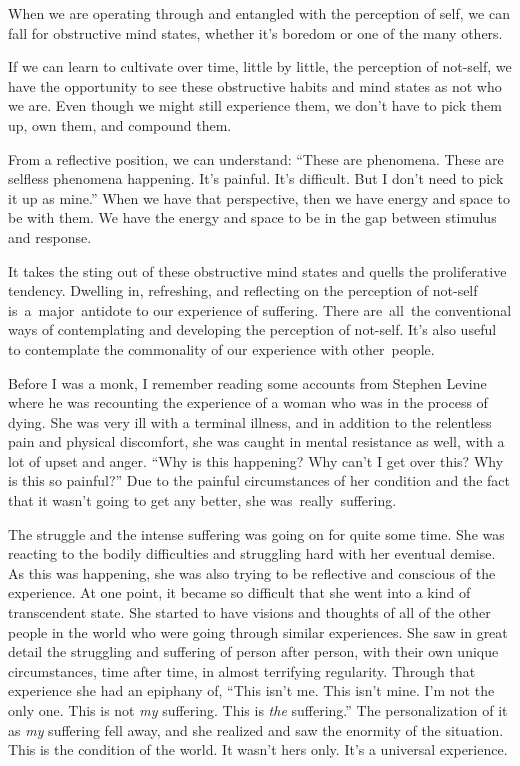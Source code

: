 When we are operating through and entangled with the perception of self, we can fall for obstructive mind states, whether it's boredom or one of the many others.

If we can learn to cultivate over time, little by little, the perception of not-self, we have the opportunity to see these obstructive habits and mind states as not who we are. Even though we might still experience them, we don't have to pick them up, own them, and compound them.

From a reflective position, we can understand: ``These are phenomena. These are selfless phenomena happening. It's painful. It's difficult. But I don't need to pick it up as mine.'' When we have that perspective, then we have energy and space to be with them. We have the energy and space to be in the gap between stimulus and response.

It takes the sting out of these obstructive mind states and quells the proliferative tendency. Dwelling in, refreshing, and reflecting on the perception of not-self
\mbox{is a major anti}dote to our experience of suffering. There \mbox{are all the} conventional ways of contemplating and developing the perception of not-self. It's also useful to contemplate the commonality of our experience with \mbox{other people.}

Before I was a monk, I remember reading some accounts from Stephen Levine where he was recounting the experience of a woman who was in the process of dying. She was very ill with a terminal illness, and in addition to the relentless pain and physical discomfort, she was caught in mental resistance as well, with a lot of upset and anger. ``Why is this happening? Why can't I get over this? Why is this so painful?'' Due to the painful circumstances of her condition and the fact that it wasn't going to get any better, she \mbox{was really suffering.}

The struggle and the intense suffering was going on for quite some time. She was reacting to the bodily difficulties and struggling hard with her eventual demise. As this was happening, she was also trying to be reflective and conscious of the experience. At one point, it became so difficult that she went into a kind of transcendent state. She started to have visions and thoughts of all of the other people in the world who were going through similar experiences. She saw in great detail the struggling and suffering of person after person, with their own unique circumstances, \linebreak time after time, in almost terrifying regularity. Through that experience she had an epiphany of, ``This isn't me. This isn't mine. I'm not the only one. This is not \emph{my} suffering. This \linebreak is \emph{the} suffering.'' The personalization of it as \emph{my} suffering fell away, and she realized and saw the enormity of the situation. This is the condition of the world. It wasn't hers only. It's a universal experience.

